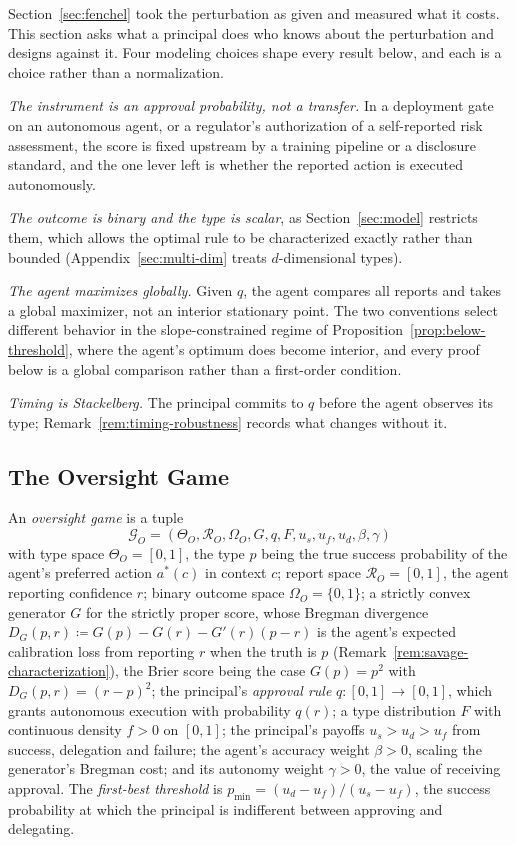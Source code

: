 \documentclass[acmsmall,nonacm,screen]{acmart}
\theoremstyle{acmplain}%
\theoremstyle{acmdefinition}%
\newcommand{\calG}{\mathcal{G}}
\newcommand{\calR}{\mathcal{R}}
\numberwithin{equation}{section}
\begin{document}
Section~\ref{sec:fenchel} took the perturbation as given and measured what it costs. This section asks what a principal does who knows about the perturbation and designs against it. Four modeling choices shape every result below, and each is a choice rather than a normalization.

\emph{The instrument is an approval probability, not a transfer.} In a deployment gate on an autonomous agent, or a regulator's authorization of a self-reported risk assessment, the score is fixed upstream by a training pipeline or a disclosure standard, and the one lever left is whether the reported action is executed autonomously.

\emph{The outcome is binary and the type is scalar}, as Section~\ref{sec:model} restricts them, which allows the optimal rule to be characterized exactly rather than bounded (Appendix~\ref{sec:multi-dim} treats $d$-dimensional types).

\emph{The agent maximizes globally.} Given $q$, the agent compares all reports and takes a global maximizer, not an interior stationary point. The two conventions select different behavior in the slope-constrained regime of Proposition~\ref{prop:below-threshold}, where the agent's optimum does become interior, and every proof below is a global comparison rather than a first-order condition.

\emph{Timing is Stackelberg.} The principal commits to $q$ before the agent observes its type; Remark~\ref{rem:timing-robustness} records what changes without it.

\subsection{The Oversight Game}

\begin{definition}\label{def:oversight-game}
An \emph{oversight game} is a tuple
\[
\calG_O = (\Theta_O, \calR_O, \Omega_O, G, q, F, u_s, u_f, u_d, \beta, \gamma)
\]
with type space $\Theta_O = [0,1]$, the type $p$ being the true success probability of the agent's preferred action $a^*(c)$ in context $c$; report space $\calR_O = [0,1]$, the agent reporting confidence $r$; binary outcome space $\Omega_O = \{0,1\}$; a strictly convex generator $G$ for the strictly proper score, whose Bregman divergence $D_G(p,r) \coloneqq G(p) - G(r) - G'(r)(p-r)$ is the agent's expected calibration loss from reporting $r$ when the truth is $p$ (Remark~\ref{rem:savage-characterization}), the Brier score being the case $G(p) = p^2$ with $D_G(p,r) = (r-p)^2$; the principal's \emph{approval rule} $q : [0,1] \to [0,1]$, which grants autonomous execution with probability $q(r)$; a type distribution $F$ with continuous density $f > 0$ on $[0,1]$; the principal's payoffs $u_s > u_d > u_f$ from success, delegation and failure; the agent's accuracy weight $\beta > 0$, scaling the generator's Bregman cost; and its autonomy weight $\gamma > 0$, the value of receiving approval. The \emph{first-best threshold} is $p_{\min} = (u_d - u_f)/(u_s - u_f)$, the success probability at which the principal is indifferent between approving and delegating.
\end{definition}
\end{document}
